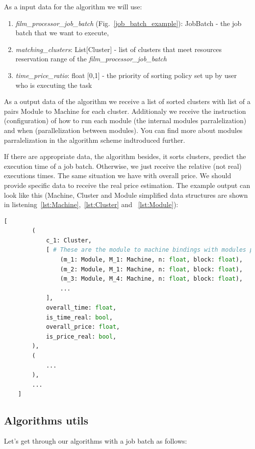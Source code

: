 \documentclass{article}
\begin{document}
	As a input data for the algorithm we will use:
	\begin{enumerate}
		\item \textit{film\_processor\_job\_batch} (Fig.~\ref{job_batch_example}): JobBatch - the job batch that we want to execute,
		\item \textit{matching\_clusters}: List[Cluster] - list of clusters that meet resources reservation range of the \textit{film\_processor\_job\_batch}
		\item \textit{time\_price\_ratio}: float [0,1] - the priority of sorting policy set up by user who is executing the task
	\end{enumerate}

	As a output data of the algorithm we receive a list of sorted clusters with list of a pairs Module to Machine for each cluster. Additionaly we receive the instruction (configuration) of how to run each module (the internal modules parralelization) and when (parallelization between modules). You can find more about modules parralelization in the algorithm scheme indtroduced further. 
	
	If there are appropriate data, the algorithm besides, it sorts clusters, predict the execution time of a job batch. Otherwise, we just receive the relative (not real) executions times. The same situation we have with overall price. We should provide specific data to receive the real price estimation. The example output can look like this (Machine, Cluster and Module simplified data structures are shown in listening~\ref{lst:Machine},~\ref{lst:Cluster} and ~\ref{lst:Module}):
	
	\begin{lstlisting}[language=Python,label={lst:AlgorithmOutput}, caption=Example output of the sorting algorithm]
	[
		(
			c_1: Cluster, 
			[ # These are the module to machine bindings with modules parralelization configuration
				(m_1: Module, M_1: Machine, n: float, block: float),
				(m_2: Module, M_1: Machine, n: float, block: float),
				(m_3: Module, M_4: Machine, n: float, block: float),
				...
			],
			overall_time: float,
			is_time_real: bool,
			overall_price: float,
			is_price_real: bool,
		),
		(
			...
		),
		...
	]
	\end{lstlisting}
	
	\subsection{Algorithms utils}
	
	Let's get through our algorithms with a job batch as follows:
	
\end{document}
